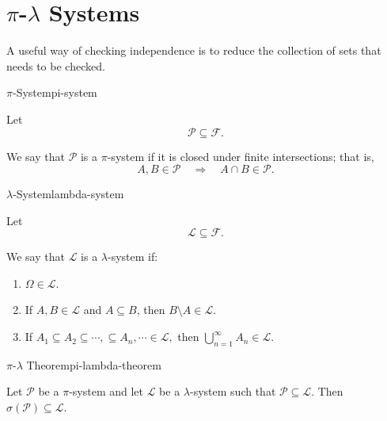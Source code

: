 \section{$\pi$-$\lambda$ Systems}

A useful way of checking independence is to reduce the collection of
sets that needs to be checked.

\begin{definition}{$\pi$-System}{pi-system}

Let
\[
    \mathcal{P}\subseteq\mathcal{F}.
\]

We say that $\mathcal{P}$ is a $\pi$-system if it is closed under
finite intersections; that is,
\[
    A,B\in\mathcal{P}
    \quad\Longrightarrow\quad
    A\cap B\in\mathcal{P}.
\]

\end{definition}

\begin{definition}{$\lambda$-System}{lambda-system}

Let
\[
    \mathcal{L}\subseteq\mathcal{F}.
\]

We say that $\mathcal{L}$ is a $\lambda$-system if:

\begin{enumerate}

    \item
    \(
        \Omega\in\mathcal{L}.
    \)

    \item If $A,B\in\mathcal{L}$ and $A\subseteq B$, then
    \(
        B\setminus A\in\mathcal{L}.
    \)

    \item If
    \(
        A_1\subseteq A_2\subseteq\cdots,
        \subseteq 
        A_n, \cdots \in\mathcal{L},
    \)
    then
    \(
        \bigcup_{n=1}^{\infty}A_n\in\mathcal{L}.
    \)

\end{enumerate}

\end{definition}


\begin{theorem}{$\pi$-$\lambda$ Theorem}{pi-lambda-theorem}

Let $\mathcal{P}$ be a $\pi$-system and let $\mathcal{L}$ be a
$\lambda$-system such that
\(
    \mathcal{P}\subseteq\mathcal{L}.
\)
Then
\(
    \sigma(\mathcal{P})
    \subseteq
    \mathcal{L}.
\)

\end{theorem}

